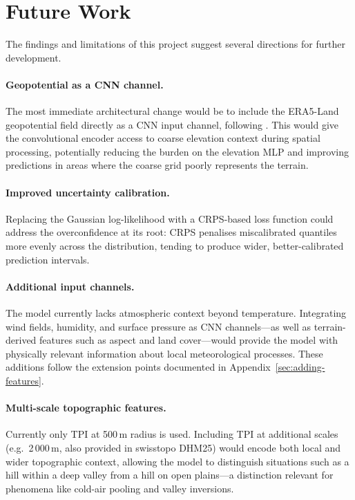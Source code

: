 \section{Future Work}

The findings and limitations of this project suggest several directions for further development.

\paragraph{Geopotential as a CNN channel.}
The most immediate architectural change would be to include the ERA5-Land geopotential field directly as a CNN input channel, following \citet{vaughan2022}. This would give the convolutional encoder access to coarse elevation context during spatial processing, potentially reducing the burden on the elevation MLP and improving predictions in areas where the coarse grid poorly represents the terrain.

\paragraph{Improved uncertainty calibration.}
Replacing the Gaussian log-likelihood with a CRPS-based loss function could address the overconfidence at its root: CRPS penalises miscalibrated quantiles more evenly across the distribution, tending to produce wider, better-calibrated prediction intervals.

\paragraph{Additional input channels.}
The model currently lacks atmospheric context beyond temperature. Integrating wind fields, humidity, and surface pressure as CNN channels---as well as terrain-derived features such as aspect and land cover---would provide the model with physically relevant information about local meteorological processes. These additions follow the extension points documented in Appendix~\ref{sec:adding-features}.

\paragraph{Multi-scale topographic features.}
Currently only TPI at 500\,m radius is used. Including TPI at additional scales (e.g.\ 2\,000\,m, also provided in swisstopo DHM25) would encode both local and wider topographic context, allowing the model to distinguish situations such as a hill within a deep valley from a hill on open plains---a distinction relevant for phenomena like cold-air pooling and valley inversions.

